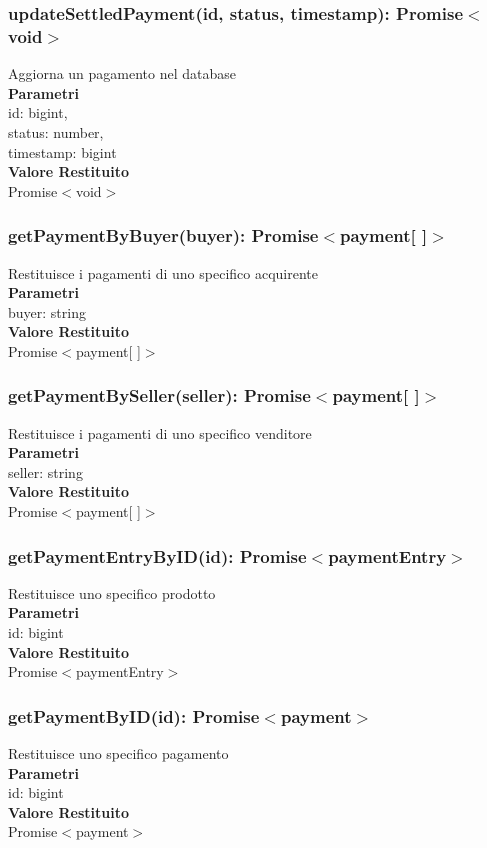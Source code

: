\documentclass[a4paper, 12pt]{article}
\begin{document}
\subsubsection{updateSettledPayment(id, status, timestamp): Promise$<$void$>$}
Aggiorna un pagamento nel database\\
\textbf{Parametri}\\
id: bigint,\\ 
status: number,\\
timestamp: bigint\\
\textbf{Valore Restituito}\\
Promise$<$void$>$
\subsubsection{getPaymentByBuyer(buyer): Promise$<$payment[ ]$>$}
Restituisce i pagamenti di uno specifico acquirente\\
\textbf{Parametri}\\
buyer: string\\
\textbf{Valore Restituito}\\
Promise$<$payment[ ]$>$
\subsubsection{getPaymentBySeller(seller): Promise$<$payment[ ]$>$}
Restituisce i pagamenti di uno specifico venditore\\
\textbf{Parametri}\\
seller: string\\
\textbf{Valore Restituito}\\
Promise$<$payment[ ]$>$
\subsubsection{getPaymentEntryByID(id): Promise$<$paymentEntry$>$}
Restituisce uno specifico prodotto\\
\textbf{Parametri}\\
id: bigint\\
\textbf{Valore Restituito}\\
Promise$<$paymentEntry$>$
\subsubsection{getPaymentByID(id): Promise$<$payment$>$}
Restituisce uno specifico pagamento\\
\textbf{Parametri}\\
id: bigint\\
\textbf{Valore Restituito}\\
Promise$<$payment$>$
\end{document}
